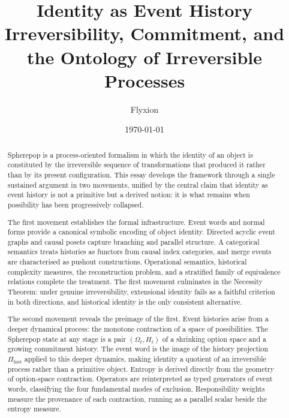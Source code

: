 \documentclass[12pt]{article}
\title{\textbf{Identity as Event History}\\[0.4em]
\large Irreversibility, Commitment, and the Ontology of Irreversible Processes}
\author{Flyxion}
\date{\today}
\theoremstyle{plain}
\theoremstyle{definition}
\theoremstyle{remark}
\begin{document}
\maketitle
\thispagestyle{empty}

\begin{abstract}
\noindent
Spherepop is a process-oriented formalism in which the identity of an object is
constituted by the irreversible sequence of transformations that produced it
rather than by its present configuration.  This essay develops the framework
through a single sustained argument in two movements, unified by the central
claim that identity as event history is not a primitive but a derived notion:
it is what remains when possibility has been progressively collapsed.

The first movement establishes the formal infrastructure.  Event words and
normal forms provide a canonical symbolic encoding of object identity.  Directed
acyclic event graphs and causal posets capture branching and parallel structure.
A categorical semantics treats histories as functors from causal index
categories, and merge events are characterised as pushout constructions.
Operational semantics, historical complexity measures, the reconstruction
problem, and a stratified family of equivalence relations complete the
treatment.  The first movement culminates in the Necessity Theorem: under
genuine irreversibility, extensional identity fails as a faithful criterion in
both directions, and historical identity is the only consistent alternative.

The second movement reveals the preimage of the first.  Event histories arise
from a deeper dynamical process: the monotone contraction of a space of
possibilities.  The Spherepop state at any stage is a pair $(\Omega_t, H_t)$
of a shrinking option space and a growing commitment history.  The event word
is the image of the history projection $\Pi_{\mathrm{hist}}$ applied to this
deeper dynamics, making identity a quotient of an irreversible process rather
than a primitive object.  Entropy is derived directly from the geometry of
option-space contraction.  Operators are reinterpreted as typed generators of
event words, classifying the four fundamental modes of exclusion.  Responsibility
weights measure the provenance of each contraction, running as a parallel scalar
beside the entropy measure.


\end{abstract}
\end{document}
